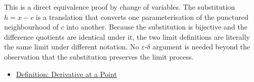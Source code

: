 \begin{remark*}
This is a direct equivalence proof by change of variables. The substitution $h = x - c$ is a translation that converts one parameterisation of the punctured neighbourhood of $c$ into another. Because the substitution is bijective and the difference quotients are identical under it, the two limit definitions are literally the same limit under different notation. No $\varepsilon$-$\delta$ argument is needed beyond the observation that the substitution preserves the limit process.
\end{remark*}

\begin{dependencies}
\begin{itemize}
  \item \hyperref[def:derivative-at-a-point]{Definition: Derivative at a Point}
\end{itemize}
\end{dependencies}

\clearpage
